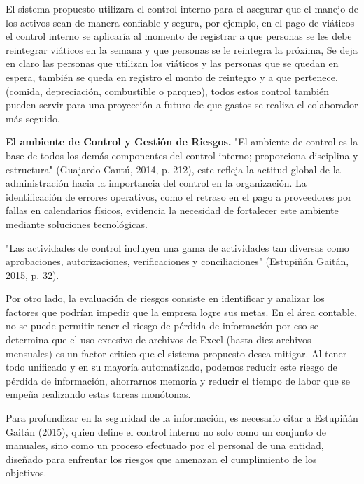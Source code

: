 El sistema propuesto utilizara el control interno para el asegurar que el manejo de los activos sean de manera confiable y segura, por ejemplo, en el pago de viáticos el control interno se aplicaría al momento de registrar a que personas se les debe reintegrar viáticos en la semana y que personas se le reintegra la próxima, Se deja en claro las personas que utilizan los viáticos y las personas que se quedan en espera, también se queda en registro el monto de reintegro y a que pertenece, (comida, depreciación, combustible o parqueo), todos estos control también pueden servir para una proyección a futuro de que gastos se realiza el colaborador más seguido.

\textbf{El ambiente de Control y Gestión de Riesgos.} "El ambiente de control es la base de todos los demás componentes del control interno; proporciona disciplina y estructura" (Guajardo Cantú, 2014, p. 212), este refleja la actitud global de la administración hacia la importancia del control en la organización. La identificación de errores operativos, como el retraso en el pago a proveedores por fallas en calendarios físicos, evidencia la necesidad de fortalecer este ambiente mediante soluciones tecnológicas.

"Las actividades de control incluyen una gama de actividades tan diversas como aprobaciones, autorizaciones, verificaciones y conciliaciones" (Estupiñán Gaitán, 2015, p. 32).

Por otro lado, la evaluación de riesgos consiste en identificar y analizar los factores que podrían impedir que la empresa logre sus metas. En el área contable, no se puede permitir tener el riesgo de pérdida de información por eso se determina que el uso excesivo de archivos de Excel (hasta diez archivos mensuales) es un factor critico que el sistema propuesto desea mitigar. Al tener todo unificado y en su mayoría automatizado, podemos reducir este riesgo de pérdida de información, ahorrarnos memoria y reducir el tiempo de labor que se empeña realizando estas tareas monótonas.

Para profundizar en la seguridad de la información, es necesario citar a Estupiñán Gaitán (2015), quien define el control interno no solo como un conjunto de manuales, sino como un proceso efectuado por el personal de una entidad, diseñado para enfrentar los riesgos que amenazan el cumplimiento de los objetivos.

